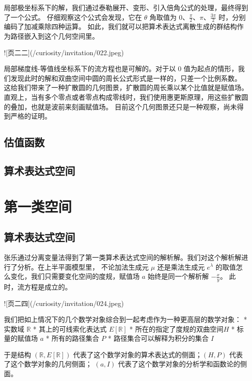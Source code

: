 \documentclass[a4paper,12pt]{book}
\numberwithin{problem}{section}
\numberwithin{definition}{section}
\numberwithin{lemma}{section}
\numberwithin{proposition}{section}
\numberwithin{theorem}{section}
\numberwithin{grammar}{section}
\numberwithin{program}{section}
\numberwithin{convention}{section}
\numberwithin{corollary}{section}
\begin{document}
局部极坐标系下的解，我们通过泰勒展开、变形、引入倍角公式的处理，最终得到了一个公式。
仔细观察这个公式会发现，它在 $\theta$ 角取值为 $0$、$\frac{\pi}{2}$、$\pi$、$\frac{3\pi}{2}$ 时，分别编码了加减乘除四种运算。
如此，我们就可以把算术表达式离散生成的群结构作为路径嵌入到这个几何空间里。

![页二二](/curiosity/invitation/022.jpeg)

局部梯度线-等值线坐标系下的流方程也是可解的。对于以 $0$ 值为起点的情形，我们发现此时的解和双曲空间中圆的周长公式形式是一样的，只差一个比例系数。
这给我们带来了一种扩散圆的几何图景，扩散圆的周长乘以某个比值就是赋值场。
直观上，当有多个零点或者零点构成零线时，我们使用惠更斯原理，用这些扩散圆的叠加，也就是波前来刻画赋值场。
目前这个几何图景还只是一种观察，尚未得到严格的证明。

\section{估值函数}

\section{算术表达式空间}

\newpage

\chapter{第一类空间}

\section{算术表达式空间}

张乐通过分离变量法得到了第一类算术表达式空间的解析解。我们对这个解析解进行了分析。在上半平面模型里，
不论加法生成元 $\mu$ 还是乘法生成元 $e^\lambda$ 的取值怎么变化，我们只需要变化空间的度规，赋值场 $a$ 始终是同一个解析解 $-\frac{x}{y}$。
此时，流方程是成立的。

![页二四](/curiosity/invitation/024.jpeg)

我们把如上情况下的几个数学对象综合到一起考虑作为一种更高层的数学对象：
* 实数域 $\mathbb{R}$
* 其上的可线索化表达式 $E[\mathbb{R}]$
* 所在的指定了度规的双曲空间$H$
* 标量的赋值场 $a$
* 所有的路径集合 $P$
* 路径集合可以解释为积分的集合 $I$

于是结构 $(\mathbb{R}, E[\mathbb{R}])$ 代表了这个数学对象的算术表达式的侧面；$(H, P)$ 代表了这个数学对象的几何侧面；
$(a, I)$ 代表了这个数学对象的分析学和函数论的侧面。
\end{document}
